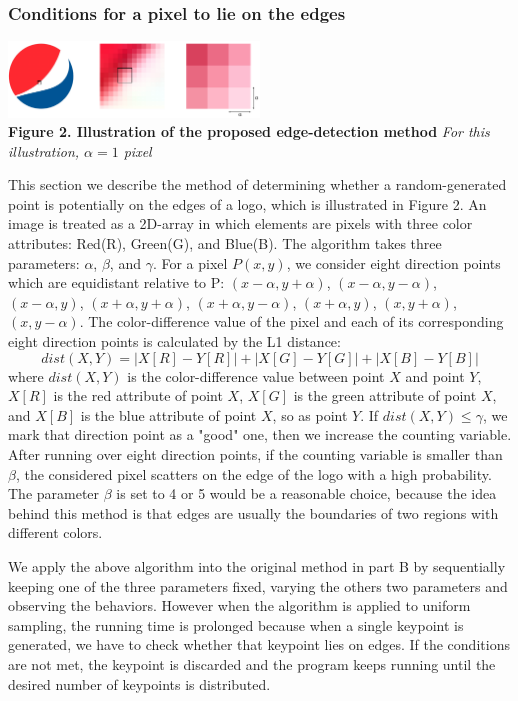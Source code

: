 \documentclass[letterpaper, 10 pt, conference]{ieeeconf}  %
\begin{document}
\subsubsection{Conditions for a pixel to lie on the edges}
\begin{center}
\includegraphics[width=0.5\textwidth]{minhhoaVA.pdf} \\
\textbf{Figure 2. Illustration of the proposed edge-detection method} \textit{For this illustration, $\alpha = 1$ pixel}
\end{center}
\par
This section we describe the method of determining whether a random-generated point is potentially on the edges of a logo, which is illustrated in Figure 2. An image is treated as a 2D-array in which elements are pixels with three color attributes: Red(R), Green(G), and Blue(B). The algorithm takes three parameters: $\alpha$, $\beta$, and $\gamma$. For a pixel $P(x,y)$, we consider eight direction points which are equidistant relative to P: $(x - \alpha, y + \alpha)$, $(x - \alpha, y - \alpha)$, $(x - \alpha, y)$, $(x + \alpha, y + \alpha)$, $(x + \alpha, y - \alpha)$, $(x + \alpha, y)$, $(x, y + \alpha)$, $(x, y - \alpha)$. The color-difference value of the pixel and each of its corresponding eight direction points is calculated by the L1 distance:
\[dist(X,Y) = |X[R] - Y[R]| + |X[G] - Y[G]| + |X[B] - Y[B]|\]
where $dist(X,Y)$ is the color-difference value between point $X$ and point $Y$, $X[R]$ is the red attribute of point $X$, $X[G]$ is the green attribute of point $X$, and $X[B]$ is the blue attribute of point $X$, so as point $Y$. If $dist(X,Y) \leq \gamma$, we mark that direction point as a "good" one, then we increase the counting variable. After running over eight direction points, if the counting variable is smaller than $\beta$, the considered pixel scatters on the edge of the logo with a high probability. The parameter $\beta$ is set to 4 or 5 would be a reasonable choice, because the idea behind this method is that edges are usually the boundaries of two regions with different colors.  \par 
We apply the above algorithm into the original method in part B by sequentially keeping one of the three parameters fixed, varying the others two parameters and observing the behaviors. However when the algorithm is applied to uniform sampling, the running time is prolonged because when a single keypoint is generated, we have to check whether that keypoint lies on edges. If the conditions are not met, the keypoint is discarded and the program keeps running until the desired number of keypoints is distributed.
\end{document}
